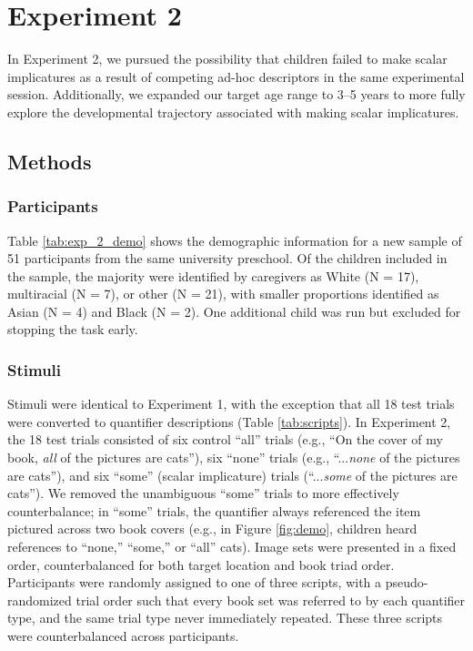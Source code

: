\documentclass[man]{apa2}
\begin{document}
\section{Experiment 2}

In Experiment 2, we pursued the possibility that children failed to make scalar implicatures as a result of competing ad-hoc descriptors in the same experimental session. Additionally, we expanded our target age range to 3--5 years to more fully explore the developmental trajectory associated with making scalar implicatures.

\subsection{Methods}
\subsubsection{Participants}

Table \ref{tab:exp_2_demo} shows the demographic information for a new sample of 51 participants from the same university preschool. Of the children included in the sample, the majority were identified by caregivers as White (N = 17), multiracial (N = 7), or other (N = 21), with smaller proportions identified as Asian (N = 4) and Black (N = 2). One additional child was run but excluded for stopping the task early.
\subsubsection{Stimuli}

Stimuli were identical to Experiment 1, with the exception that all 18 test trials were converted to quantifier descriptions (Table \ref{tab:scripts}). In Experiment 2, the 18 test trials consisted of six control ``all'' trials (e.g., ``On the cover of my book, \textit{all} of the pictures are cats''), six ``none'' trials (e.g., ``...\textit{none} of the pictures are cats''), and six ``some'' (scalar implicature) trials (``...\textit{some} of the pictures are cats''). We removed the unambiguous ``some'' trials to more effectively counterbalance; in ``some'' trials, the quantifier always referenced the item pictured across two book covers (e.g., in Figure \ref{fig:demo}, children heard references to ``none,'' ``some,'' or ``all'' cats). Image sets were presented in a fixed order, counterbalanced for both target location and book triad order. Participants were randomly assigned to one of three scripts, with a pseudo-randomized trial order such that every book set was referred to by each quantifier type, and the same trial type never immediately repeated. These three scripts were counterbalanced across participants.
\end{document}
